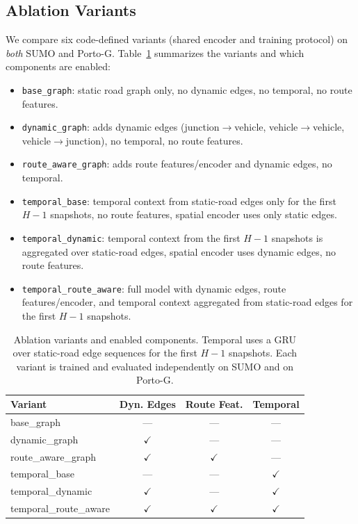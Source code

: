 \documentclass[pdflatex,sn-basic,Numbered]{sn-jnl}%
\begin{document}
\subsection{Ablation Variants}\label{sec:ablation-variants}
We compare six code-defined variants (shared encoder and training protocol) on \emph{both} SUMO and Porto-G. Table~\ref{tab:ablation_variants} summarizes the variants and which components are enabled:
\begin{itemize}
    \item \texttt{base\_graph}: static road graph only, no dynamic edges, no temporal, no route features.
    \item \texttt{dynamic\_graph}: adds dynamic edges (junction$\to$vehicle, vehicle$\to$vehicle, vehicle$\to$junction), no temporal, no route features.
    \item \texttt{route\_aware\_graph}: adds route features/encoder and dynamic edges, no temporal.
    \item \texttt{temporal\_base}: temporal context from static-road edges only for the first $H{-}1$ snapshots, no route features, spatial encoder uses only static edges.
    \item \texttt{temporal\_dynamic}: temporal context from the first $H{-}1$ snapshots is aggregated over static-road edges, spatial encoder uses dynamic edges, no route features.
    \item \texttt{temporal\_route\_aware}: full model with dynamic edges, route features/encoder, and temporal context aggregated from static-road edges for the first $H{-}1$ snapshots.
\end{itemize}

\begin{table}[t]
    \centering
    \caption{Ablation variants and enabled components. Temporal uses a GRU over static-road edge sequences for the first $H{-}1$ snapshots. Each variant is trained and evaluated independently on SUMO and on Porto-G.}
    \label{tab:ablation_variants}
    \begin{tabular}{@{}lccc@{}}
        \toprule
        \textbf{Variant} & \textbf{Dyn. Edges} & \textbf{Route Feat.} & \textbf{Temporal} \\
        \midrule
        base\_graph              & --- & --- & --- \\
        dynamic\_graph           & $\checkmark$ & --- & --- \\
        route\_aware\_graph      & $\checkmark$ & $\checkmark$ & --- \\
        temporal\_base           & --- & --- & $\checkmark$ \\
        temporal\_dynamic        & $\checkmark$ & --- & $\checkmark$ \\
        temporal\_route\_aware    & $\checkmark$ & $\checkmark$ & $\checkmark$ \\
        \bottomrule
    \end{tabular}
\end{table}
\end{document}
